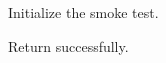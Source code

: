 \documentclass{article}
\begin{document}
\begin{codelines}
\item Initialize the smoke test.
\item Return successfully.
\end{codelines}
\end{document}
